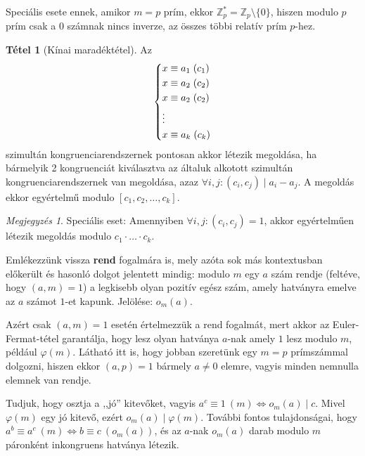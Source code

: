 \documentclass[12pt]{book}
\theoremstyle{plain} %
\theoremstyle{definition} %
\newtheorem{theo/}{Tétel}[section]
\newenvironment{theo}
  {\renewcommand{\qedsymbol}{$\clubsuit$}%
   \pushQED{\qed}\begin{theo/}}
  {\popQED\end{theo/}}
\theoremstyle{remark}
\newtheorem*{mj}{Megjegyzés}
\renewcommand\qedsymbol{$\blacksquare$}
\numberwithin{equation}{section}  %
\begin{document}
	Speciális esete ennek, amikor $m=p$ prím, ekkor $\mathbb{Z}_p^{*} = \mathbb{Z}_p \setminus \{0\} $, hiszen modulo $p$ prím csak a $0$ számnak nincs inverze, az összes többi relatív prím $p$-hez. 
	
	\begin{theo}[Kínai maradéktétel]
		Az
		\[
		\begin{cases*}
		x \equiv a_1 \hspace{1mm} (c_1) \\
		x \equiv a_2 \hspace{1mm} (c_2) \\
		x \equiv a_2 \hspace{1mm} (c_2) \\
		\vdots \\
		x \equiv a_k \hspace{1mm} (c_k) \\
		\end{cases*}
		\]
		szimultán kongruenciarendszernek pontosan akkor létezik megoldása, ha bármelyik 2 kongruenciát kiválasztva az általuk alkotott szimultán kongruenciarendszernek van megoldása, azaz $\forall i,j\colon (c_i,c_j)\mid a_i-a_j$. A megoldás ekkor egyértelmű modulo $[c_1,c_2,\ldots, c_k]$.
	\end{theo}

	\begin{mj}
		Speciális eset: Amennyiben $\forall i,j\colon (c_i,c_j)=1$, akkor egyértelműen létezik megoldás modulo $c_1\cdot \ldots \cdot c_k$.
	\end{mj}
	
	Emlékezzünk vissza \textbf{rend} fogalmára is, mely azóta sok más kontextusban előkerült és hasonló dolgot jelentett mindig: modulo $m$ egy $a$ szám rendje (feltéve, hogy $(a,m)=1$) a legkisebb olyan pozitív egész szám, amely hatványra emelve az $a$ számot $1$-et kapunk. Jelölése: $o_m(a)$.
	
	Azért csak $(a,m)=1$ esetén értelmezzük a rend fogalmát, mert akkor az Euler-Fermat-tétel garantálja, hogy lesz olyan hatványa $a$-nak amely $1$ lesz modulo $m$, például $\varphi(m)$. Látható itt is, hogy jobban szeretünk egy $m=p$ prímszámmal dolgozni, hiszen ekkor $(a,p)=1$ bármely $a\neq 0$ elemre, vagyis minden nemnulla elemnek van rendje.
	
	Tudjuk, hogy osztja a ,,jó'' kitevőket, vagyis $a^c \equiv 1 \ (m) \Leftrightarrow o_m(a)\mid c$. Mivel $\varphi(m)$ egy jó kitevő, ezért $o_m(a)\mid \varphi(m)$. További fontos tulajdonságai, hogy $a^b\equiv a^c\ (m) \Leftrightarrow b\equiv c \ (o_m(a))$, és az $a$-nak $o_m(a)$ darab modulo $m$ páronként inkongruens hatványa létezik.
	
\end{document}
